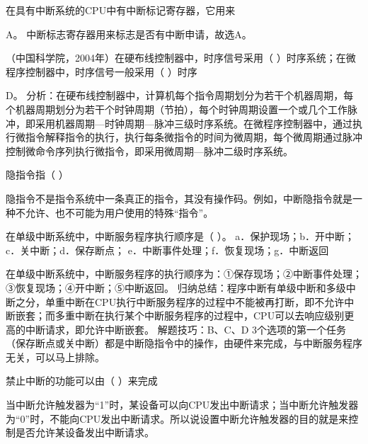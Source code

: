 \question 在具有中断系统的CPU中有中断标记寄存器，它用来
\par{}
\begin{solution}A。 中断标志寄存器用来标志是否有中断申请，故选A。
\end{solution}
\question （中国科学院，2004年）在硬布线控制器中，时序信号采用（
）时序系统；在微程序控制器中，时序信号一般采用（ ）时序
\par{}
\begin{solution}D。
分析：在硬布线控制器中，计算机每个指令周期划分为若干个机器周期，每个机器周期划分为若干个时钟周期（节拍），每个时钟周期设置一个或几个工作脉冲，即采用机器周期---时钟周期---脉冲三级时序系统。在微程序控制器中，通过执行微指令解释指令的执行，执行每条微指令的时间为微周期，每个微周期通过脉冲控制微命令序列执行微指令，即采用微周期---脉冲二级时序系统。
\end{solution}
\question 隐指令指（ ）
\par{}
\begin{solution}隐指令不是指令系统中一条真正的指令，其没有操作码。例如，中断隐指令就是一种不允许、也不可能为用户使用的特殊``指令''。
\end{solution}
\question 在单级中断系统中，中断服务程序执行顺序是（ ）。
a．保护现场；b．开中断；c．关中断；d．保存断点；
e．中断事件处理；f．恢复现场；g．中断返回
\par{}
\begin{solution}在单级中断系统中，中断服务程序的执行顺序为：①保存现场；②中断事件处理；③恢复现场；④开中断；⑤中断返回。
归纳总结：程序中断有单级中断和多级中断之分，单重中断在CPU执行中断服务程序的过程中不能被再打断，即不允许中断嵌套；而多重中断在执行某个中断服务程序的过程中，CPU可以去响应级别更高的中断请求，即允许中断嵌套。
解题技巧：B、C、D
3个选项的第一个任务（保存断点或关中断）都是中断隐指令中的操作，由硬件来完成，与中断服务程序无关，可以马上排除。
\end{solution}
\question 禁止中断的功能可以由（ ）来完成
\par{}
\begin{solution}当中断允许触发器为``1''时，某设备可以向CPU发出中断请求；当中断允许触发器为``0''时，不能向CPU发出中断请求。所以说设置中断允许触发器的目的就是来控制是否允许某设备发出中断请求。
\end{solution}
